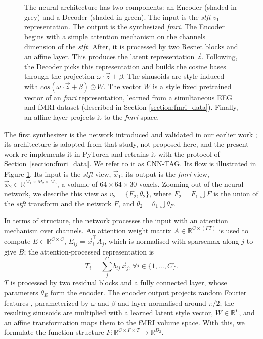 \documentclass{article}
\begin{document}
\begin{figure}[!t]
\begin{tikzpicture}
    \end{tikzpicture}
    \caption{The neural architecture has two components: an Encoder (shaded in grey) and a Decoder (shaded in green). The input is the \textit{stft} $v_1$ representation. The output is the synthesized \textit{fmri}. The Encoder begins with a simple attention mechanism on the channels dimension of the \textit{stft}. After, it is processed by two Resnet blocks and an affine layer. This produces the latent representation $\vec{z}$. Following, the Decoder picks this representation and builds the cosine bases through the projection $\omega \cdot \vec{z} + \beta$. The sinusoids are style induced with $cos(\omega \cdot \vec{z} + \beta)\odot W$. The vector $W$ is a style fixed pretrained vector of an \textit{fmri} representation, learned from a simultaneous EEG and fMRI dataset (described in Section \ref{section:fmri_data}). Finally, an affine layer projects it to the \textit{fmri} space.}
    \label{fig:horizontal_architecture}
\end{figure}


The first synthesizer is the network introduced and validated in our earlier work \cite{calhas2022eeg}; its architecture is adopted from that study, not proposed here, and the present work re-implements it in PyTorch and retrains it with the protocol of Section~\ref{section:fmri_data}. We refer to it as CNN-TAG. Its flow is illustrated in Figure \ref{fig:horizontal_architecture}. Its input is the \textit{stft} view, $\vec{x}_1$; its output is the \textit{fmri} view, $\vec{x}_2 \in \mathbb{R}^{M_1 \times M_2 \times M_3}$, a volume of $64\times64\times30$ voxels. Zooming out of the neural network, we describe this view as $v_2 = \{ F_2, \theta_2\}$, where $F_2 = F_1 \bigcup F$ is the union of the \textit{stft} transform and the network $F$, and $\theta_2 = \theta_1 \bigcup \theta_F$.

In terms of structure, the network processes the input with an attention mechanism over channels. An attention weight matrix $A \in \mathbb{R}^{C \times (F T)}$ is used to compute $E \in \mathbb{R}^{C \times C}$, $E_{ij} = \vec{x}_i^\top A_j$, which is normalised with sparsemax along $j$ to give $B$; the attention-processed representation is
\begin{equation}\label{equation:attention_output}
    T_i  = \sum_j^C b_{ij}\, \vec{x}_j, \forall i \in \{1, \dots, C\}.
\end{equation}
$T$ is processed by two residual blocks \cite{he2016deep} and a fully connected layer, whose parameters $\theta_E$ form the encoder. The encoder output projects random Fourier features \cite{rahimi2007random,tancik2020fourier}, parameterized by $\omega$ and $\beta$ and layer-normalised around $\pi/2$; the resulting sinusoids are multiplied with a learned latent style vector, $W \in \mathbb{R}^L$, and an affine transformation maps them to the fMRI volume space. With this, we formulate the function structure $F: \mathbb{R}^{C \times F \times T} \to \mathbb{R}^{D_2}$.
\end{document}
